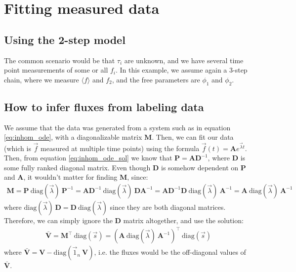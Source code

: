\documentclass{article}
\newcommand{\fin}{\ensuremath{\langle f \rangle}}
\begin{document}
\clearpage
\section{Fitting measured data}

\subsection{Using the 2-step model}
The common scenario would be that $\tau_i$ are unknown, and we have several time point measurements of some or all $f_i$. In this example, we assume again a 3-step chain, where we measure $\fin$ and $f_2$, and the free parameters are $\phi_1$ and $\phi_2$. 

\subsection{How to infer fluxes from labeling data}

We assume that the data was generated from a system such as in equation \ref{eq:inhom_ode}, with a diagonalizable matrix $\mathbf{M}$. Then, we can fit our data (which is $\vec{f}$ measured at multiple time points) using the formula $\vec{f}(t) = \mathbf{A} e^{\vec{\lambda} t}$. Then, from equation \ref{eq:inhom_ode_sol} we know that $\mathbf{P} = \mathbf{A} \mathbf{D}^{-1}$, where $\mathbf{D}$ is some fully ranked diagonal matrix. Even though $\mathbf{D}$ is somehow dependent on $\mathbf{P}$ and $\mathbf{A}$, it wouldn't matter for finding $\mathbf{M}$, since:
\begin{eqnarray}
    \mathbf{M} = \mathbf{P}~\text{diag}(\vec{\lambda})~\mathbf{P}^{-1} = \mathbf{A}\mathbf{D}^{-1}~\text{diag}(\vec{\lambda})~\mathbf{D}\mathbf{A}^{-1} = 
    \mathbf{A}\mathbf{D}^{-1}\mathbf{D}~\text{diag}(\vec{\lambda})~\mathbf{A}^{-1} = 
    \mathbf{A}~\text{diag}(\vec{\lambda})~\mathbf{A}^{-1}
\end{eqnarray}
where $\text{diag}(\vec{\lambda})~\mathbf{D} = \mathbf{D}~\text{diag}(\vec{\lambda})$ since they are both diagonal matrices. Therefore, we can simply ignore the $\mathbf{D}$ matrix altogether, and use the solution:
\begin{eqnarray}
    \mathbf{\bar{V}} = \mathbf{M}^\top~\text{diag}(\vec{s}) = \left(\mathbf{A}~\text{diag}(\vec{\lambda})~\mathbf{A}^{-1} \right)^\top~\text{diag}(\vec{s})
\end{eqnarray}
where $\mathbf{\bar{V}} = \mathbf{V} - \text{diag}(\vec{1}_n~\mathbf{V})$, i.e. the fluxes would be the off-diagonal values of $\mathbf{\bar{V}}$.
\end{document}
